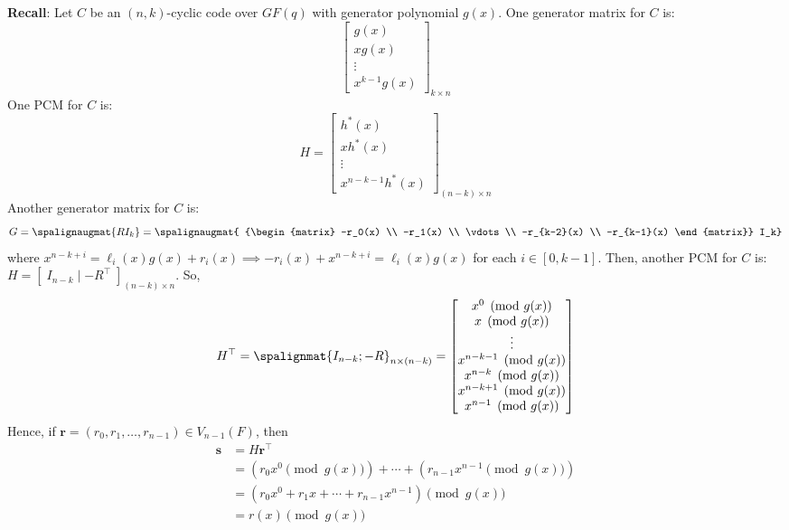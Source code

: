 \textbf{Recall}: Let $ C $ be an $ (n,k) $-cyclic code over $ GF(q) $ with generator
polynomial $ g(x) $. One generator matrix for $ C $ is:
\[
    \begin{bmatrix}
        g(x)   \\
        x g(x) \\
        \vdots \\
        x^{k-1}g(x)
    \end{bmatrix}_{k\times n} \]
One PCM for $ C $ is:
\[ H=
    \begin{bmatrix}
        h^*(x)   \\
        x h^*(x) \\
        \vdots   \\
        x^{n-k-1}h^*(x)
    \end{bmatrix}_{(n-k)\times n} \]
Another generator matrix for $ C $ is:
\[ G=\spalignaugmat{R I_k}=
    \spalignaugmat{
        {\begin{matrix}
                    -r_0(x)     \\
                    -r_1(x)     \\
                    \vdots      \\
                    -r_{k-2}(x) \\
                    -r_{k-1}(x)
                \end{matrix}}
        I_k}
\]
where $ x^{n-k+i}=\ell_i(x)g(x)+r_i(x)\implies -r_i(x)+x^{n-k+i}=\ell_i(x)g(x) $ for each $ i\in[0,k-1] $.
Then, another PCM for $ C $ is: $ H=\left[ \; I_{n-k}\mid -R^\top \; \right]_{(n-k)\times n} $. So,
\[ H^\top=
    \spalignmat{I_{n-k}; -R}_{n\times (n-k)}
    =
    \begin{bmatrix}
        x^0\pmod{g(x)}       \\
        x \pmod{g(x)}        \\
        \vdots               \\
        x^{n-k-1}\pmod{g(x)} \\
        x^{n-k}\pmod{g(x)}   \\
        x^{n-k+1}\pmod{g(x)} \\
        x^{n-1}\pmod{g(x)}
    \end{bmatrix} \]
Hence, if $ \symbf{r}=(r_0,r_1,\ldots ,r_{n-1})\in V_{n-1}(F) $, then
\begin{align*}
    \symbf{s}
     & =H\symbf{r}^\top                                         \\
     & =(r_0 x^0\pmod{g(x)})+\cdots+(r_{n-1}x^{n-1}\pmod{g(x)}) \\
     & =(r_0x^0+r_1x+\cdots+r_{n-1}x^{n-1})\pmod{g(x)}          \\
     & =r(x)\pmod{g(x)}
\end{align*}

